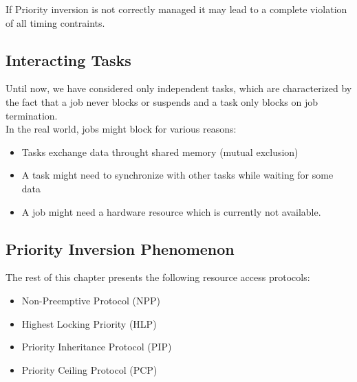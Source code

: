 If Priority inversion is not correctly managed it may lead to a complete violation of all timing contraints.
\subsection{Interacting Tasks}
Until now, we have considered only independent tasks, which are characterized by the fact that a job never blocks or suspends and a task only blocks on job termination.\\
In the real world, jobs might block for various reasons:
\begin{itemize}
    \item Tasks exchange data throught shared memory (mutual exclusion)
    \item A task might need to synchronize with other tasks while waiting for some data
    \item A job might need a hardware resource which is currently not available.
\end{itemize}


\subsection{Priority Inversion Phenomenon}

The rest of this chapter presents the following resource access protocols:
\begin{itemize}
    \item Non-Preemptive Protocol (NPP)
    \item Highest Locking Priority (HLP)
    \item Priority Inheritance Protocol (PIP)
    \item Priority Ceiling Protocol (PCP)
\end{itemize}

